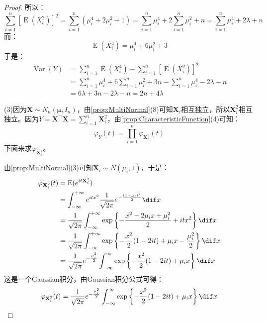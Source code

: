 \begin{proof}
	所以：
	\begin{equation*}
		\sum_{i=1}^{n}[\operatorname{E}(X_i^2)]^2=\sum_{i=1}^{n}(\mu_i^4+2\mu_i^2+1)=\sum_{i=1}^{n}\mu_i^4+2\sum_{i=1}^{n}\mu_i^2+n=\sum_{i=1}^{n}\mu_i^4+2\lambda+n
	\end{equation*}
	而：
	\begin{equation*}
		\operatorname{E}(X_i^4)=\mu_i^4+6\mu_i^2+3
	\end{equation*}
	于是：
	\begin{align*}
		\operatorname{Var}(Y)
		&=\sum_{i=1}^{n}\operatorname{E}(X_i^4)-\sum_{i=1}^{n}[\operatorname{E}(X_i^2)]^2 \\
		&=\sum_{i=1}^{n}\mu_i^4+6\sum_{i=1}^{n}\mu_i^2+3n-\sum_{i=1}^{n}\mu_i^4-2\lambda-n \\
		&=6\lambda+3n-2\lambda-n=2n+4\lambda
	\end{align*}\par
	(3)因为$\mathbf{X}\sim N_n(\boldsymbol{\mu},I_n)$，由\cref{prop:MultiNormal}(8)可知$\mathbf{X}_i$相互独立，所以$\mathbf{X}_i^2$相互独立。因为$Y=\mathbf{X}^{\top}\mathbf{X}=\sum\limits_{i=1}^n\mathbf{X}_i^2$，由\cref{prop:CharacteristicFunction}(4)可知：
	\begin{equation*}
		\varphi_{Y}(t)=\prod_{i=1}^n\varphi_{\mathbf{X}_i^2}(t)
	\end{equation*}
	下面来求$\varphi_{\mathbf{X}_i^2}$。\par
	由\cref{prop:MultiNormal}(3)可知$\mathbf{X}_i\sim N(\mu_i,1)$，于是：
	\begin{align*}
		\varphi_{\mathbf{X}_i^2}(t)
		&=\operatorname{E}(e^{it\mathbf{X}_i^2}) \\
		&=\int_{-\infty}^{+\infty}e^{itx^2}\frac{1}{\sqrt{2\pi}}e^{-\frac{(x-\mu_i)^2}{2}}\dif x \\
		&=\frac{1}{\sqrt{2\pi}}\int_{-\infty}^{+\infty}\exp\left\{-\frac{x^2 - 2\mu_ix + \mu_i^2}{2} + itx^2\right\}\dif x \\
		&=\frac{1}{\sqrt{2\pi}}\int_{-\infty}^{+\infty}\exp\left\{-\frac{x^2}{2} (1 - 2it) + \mu_ix - \frac{\mu_i^2}{2}\right\}\dif x \\
		&=\frac{1}{\sqrt{2\pi}}e^{-\frac{\mu_i^2}{2}} \int_{-\infty}^{\infty} \exp\left\{-\frac{x^2}{2} (1 - 2it) + \mu_ix\right\}\dif x
	\end{align*}
	这是一个Gaussian积分，由Gaussian积分公式可得：
	\begin{align*}
		\varphi_{\mathbf{X}_i^2}(t)
		&=\frac{1}{\sqrt{2\pi}}e^{-\frac{\mu_i^2}{2}} \int_{-\infty}^{\infty}\exp\left\{-\frac{x^2}{2} (1 - 2it) + \mu_i x\right\}\dif x \\

\end{align*}
\end{proof}
